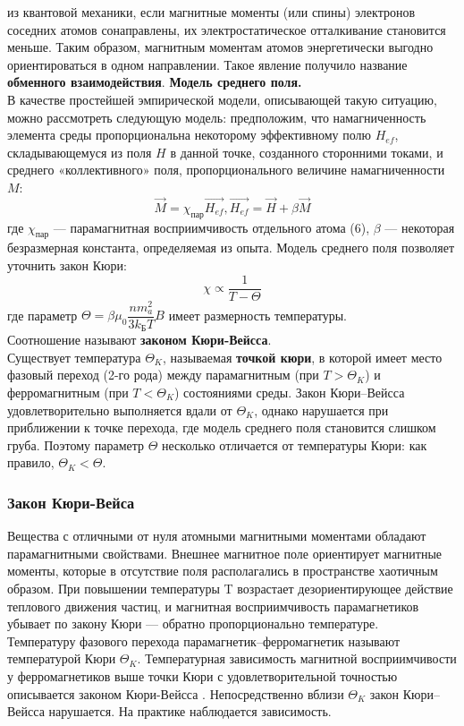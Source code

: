 \documentclass[a4paper]{article}
\begin{document}
из квантовой механики, если магнитные моменты (или спины) электронов соседних атомов сонаправлены, их электростатическое отталкивание становится меньше. Таким образом, магнитным моментам атомов энергетически выгодно ориентироваться в одном направлении. Такое явление получило название \textbf{обменного взаимодействия}.
	\textbf{Модель среднего поля.}\\
	В качестве простейшей эмпирической модели, описывающей такую ситуацию, можно рассмотреть следующую модель: предположим, что намагниченность элемента среды пропорциональна некоторому эффективному полю $H_{ef}$, складывающемуся из поля $H$ в данной точке, созданного сторонними токами, и среднего «коллективного» поля, пропорционального величине намагниченности $M$:
\begin{equation}\label{}
\vec{M} = \chi_{\text{пар}} \vec{H_{ef}},  \vec{H_{ef}} = \vec{H}+\beta \vec{M}
\end{equation}
где $\chi_{\text{пар}}$ — парамагнитная восприимчивость отдельного атома (6), $\beta$ --- некоторая безразмерная константа, определяемая из опыта.
Модель среднего поля позволяет уточнить закон Кюри:
\begin{equation}\label{}
\chi \propto \dfrac{1}{T-\Theta}
\end{equation}
где параметр $\Theta = \beta \mu_0 \dfrac{n m_a^2}{3k_{\text{Б}}T}B$ имеет размерность температуры.\\
Соотношение называют \textbf{законом Кюри-Вейсса}. \\
Существует температура $\Theta_K$, называемая \textbf{точкой кюри}, в которой имеет место фазовый
переход (2-го рода) между парамагнитным (при $T>\Theta_K$) и ферромагнитным (при $T<\Theta_K$) состояниями среды. Закон Кюри–Вейсса удовлетворительно выполняется вдали от $\Theta_K$, однако нарушается при приближении к точке перехода, где модель среднего поля становится
слишком груба. Поэтому параметр $\Theta$ несколько отличается от
температуры Кюри: как правило, $\Theta_K < \Theta$.

\subsubsection{Закон Кюри-Вейса}
Вещества с отличными от нуля атомными магнитными моментами
обладают парамагнитными свойствами. Внешнее магнитное поле ориентирует магнитные моменты, которые в отсутствие поля располагались
в пространстве хаотичным образом. При повышении температуры T возрастает дезориентирующее действие теплового движения частиц, и магнитная восприимчивость парамагнетиков убывает по закону Кюри --- обратно пропорционально температуре.\\
Температуру фазового перехода парамагнетик–ферромагнетик называют температурой Кюри $\Theta_K$. Температурная зависимость магнитной восприимчивости у ферромагнетиков выше точки Кюри с удовлетворительной
точностью описывается законом Кюри-Вейсса .
Непосредственно вблизи $\Theta_K$ закон Кюри–Вейсса нарушается. На практике наблюдается зависимость.
\end{document}
